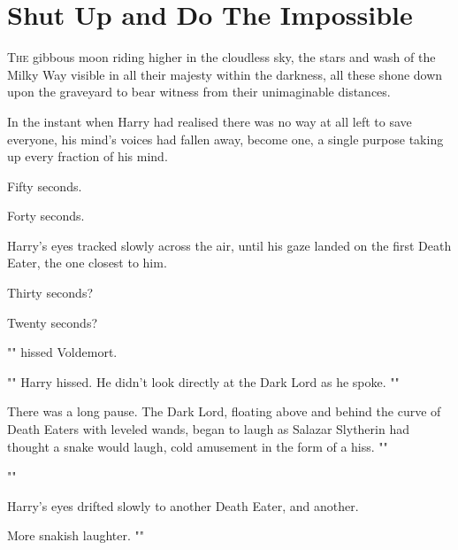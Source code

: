 \chapter{Shut Up and Do The Impossible}

\lettrine{T}{he} gibbous moon
riding higher in the cloudless sky, the stars and wash of the Milky Way visible
in all their majesty within the darkness, all these shone down upon the
graveyard to bear witness from their unimaginable distances.

In the instant when Harry had realised there was no way at all left to save
everyone, his mind's voices had fallen away, become one, a single purpose
taking up every fraction of his mind.

Fifty seconds.

Forty seconds.

Harry's eyes tracked slowly across the air, until his gaze landed on the first
Death Eater, the one closest to him.

Thirty seconds?

Twenty seconds?

"" hissed Voldemort.

"" Harry hissed. He didn't
look directly at the Dark Lord as he spoke. ""

There was a long pause. The Dark Lord, floating above and behind the curve of
Death Eaters with leveled wands, began to laugh as Salazar Slytherin had
thought a snake would laugh, cold amusement in the form of a hiss. ""

""

Harry's eyes drifted slowly to another Death Eater, and another.

More snakish laughter. ""

